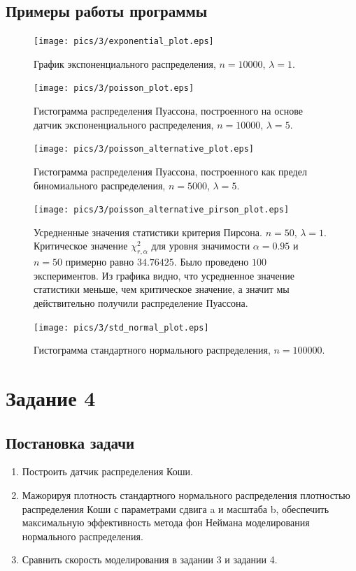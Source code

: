 \documentclass[11pt]{article}
\begin{document}
\subsection{Примеры работы программы}
\begin{figure}[h!]
	\centering
	\texttt{[image: pics/3/exponential\_plot.eps]}
	\caption{График экспоненциального распределения, $n = 10000$, $\lambda = 1$.}
\end{figure}
\begin{figure}[h!]
	\centering
	\texttt{[image: pics/3/poisson\_plot.eps]}
	\caption{Гистограмма распределения Пуассона, построенного на основе датчик экспоненциального распределения, $n = 10000$, $\lambda = 5$.}
\end{figure}
\begin{figure}[h!]
	\centering
	\texttt{[image: pics/3/poisson\_alternative\_plot.eps]}
	\caption{Гистограмма распределения Пуассона, построенного как предел биномиального распределения, $n = 5000$, $\lambda = 5$.}
\end{figure}
\begin{figure}[h!]
	\centering
	\texttt{[image: pics/3/poisson\_alternative\_pirson\_plot.eps]}
	\caption{Усредненные значения статистики критерия Пирсона. $n = 50$, $\lambda = 1$. Критическое значение $\chi^2_{r,\alpha}$ для уровня значимости $\alpha = 0.95$ и $n = 50$ примерно равно $34.76425$. Было проведено $100$ экспериментов. Из графика видно, что усредненное значение статистики меньше, чем критическое значение, а значит мы действительно получили распределение Пуассона.}
\end{figure}
\begin{figure}[h!]
	\centering
	\texttt{[image: pics/3/std\_normal\_plot.eps]}
	\caption{Гистограмма стандартного нормального распределения, $n = 100000$.}
\end{figure}
\pagebreak
\section{Задание 4}
\subsection{Постановка задачи}
\begin{enumerate}
\item Построить датчик распределения Коши.
\item Мажорируя плотность стандартного нормального распределения плотностью распределения Коши с параметрами сдвига a и масштаба b, обеспечить максимальную эффективность метода фон Неймана моделирования нормального распределения.
\item Сравнить скорость моделирования в задании 3 и задании 4.
\end{enumerate}
\end{document}
